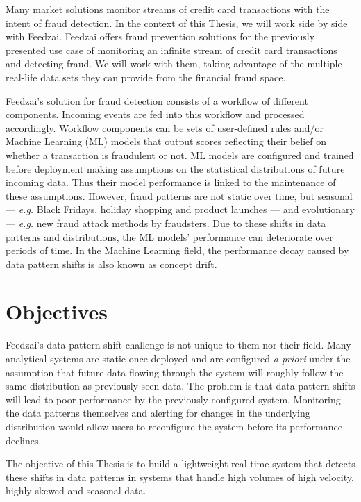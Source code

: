 Many market solutions monitor streams of credit card transactions with the intent of fraud detection. In the context of this Thesis, we will work side by side with Feedzai. Feedzai offers fraud prevention solutions for the previously presented use case of monitoring an infinite stream of credit card transactions and detecting fraud. We will work with them, taking advantage of the multiple real-life data sets they can provide from the financial fraud space. 

Feedzai's solution for fraud detection consists of a workflow of different components. Incoming events are fed into this workflow and processed accordingly. Workflow components can be sets of user-defined rules and/or Machine Learning (ML) models that output scores reflecting their belief on whether a transaction is fraudulent or not. ML models are configured and trained before deployment making assumptions on the statistical distributions of future incoming data. Thus their model performance is linked to the maintenance of these assumptions. However, fraud patterns are not static over time, but seasonal --- \textit{e.g.} Black Fridays, holiday shopping and product launches --- and evolutionary --- \textit{e.g.} new fraud attack methods by fraudsters. Due to these shifts in data patterns and distributions, the ML models' performance can deteriorate over periods of time. In the Machine Learning field, the performance decay caused by data pattern shifts is also known as concept drift. %

\section{Objectives} \label{sec:objectives}
Feedzai's data pattern shift challenge is not unique to them nor their field. Many analytical systems are static once deployed and are configured \textit{a priori} under the assumption that future data flowing through the system will roughly follow the same distribution as previously seen data.
The problem is that data pattern shifts will lead to poor performance by the previously configured system. Monitoring the data patterns themselves and alerting for changes in the underlying distribution would allow users to reconfigure the system before its performance declines.

The objective of this Thesis is to build a lightweight real-time system that detects these shifts in data patterns in systems that handle high volumes of high velocity, highly skewed and seasonal data.


